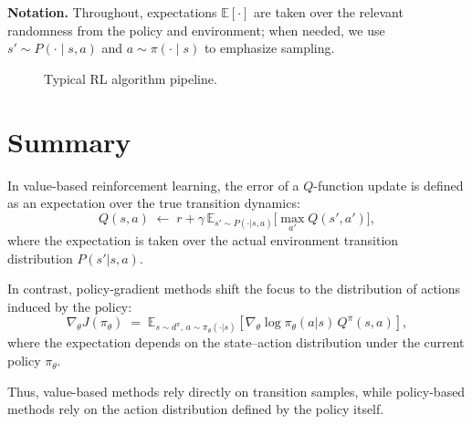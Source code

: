 \bigskip
\noindent\textbf{Notation.} Throughout, expectations $\mathbb{E}[\cdot]$ are taken over the relevant randomness from the policy and environment; when needed, we use $s'\sim P(\cdot\mid s,a)$ and $a\sim \pi(\cdot\mid s)$ to emphasize sampling.


\begin{figure}[h]
\centering
{}

\medskip
\caption{Typical RL algorithm pipeline.}
\end{figure}


\section{Summary}
In value-based reinforcement learning, the error of a $Q$-function update is defined as an 
expectation over the true transition dynamics:
\[
Q(s,a) \;\leftarrow\; r + \gamma \, \mathbb{E}_{s' \sim P(\cdot|s,a)} \big[ \max_{a'} Q(s',a') \big],
\]
where the expectation is taken over the actual environment transition distribution 
$P(s'|s,a)$. 

In contrast, policy-gradient methods shift the focus to the distribution of actions 
induced by the policy:
\[
\nabla_\theta J(\pi_\theta) \;=\; \mathbb{E}_{s \sim d^{\pi}, \, a \sim \pi_\theta(\cdot|s)}
\!\left[ \nabla_\theta \log \pi_\theta(a|s)\, Q^{\pi}(s,a) \right],
\]
where the expectation depends on the state--action distribution under the current 
policy $\pi_\theta$. 

Thus, value-based methods rely directly on transition samples, while 
policy-based methods rely on the action distribution defined by the policy itself.
